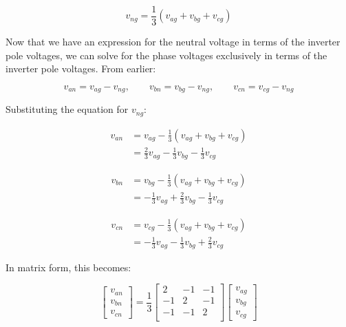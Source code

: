 \documentclass{article}
\begin{document}
\begin{equation}
    v_{ng} = \frac{1}{3}(v_{ag} + v_{bg} + v_{cg})
\end{equation}

Now that we have an expression for the neutral voltage in terms of the inverter pole voltages, we can solve for the phase voltages exclusively in terms of the inverter pole voltages. From earlier:

\begin{equation}
    v_{an} = v_{ag} - v_{ng}, \qquad
    v_{bn} = v_{bg} - v_{ng}, \qquad
    v_{cn} = v_{cg} - v_{ng}
\end{equation}

Substituting the equation for $v_{ng}$:

\begin{align}
    v_{an} &= v_{ag} - \frac{1}{3}(v_{ag} + v_{bg} + v_{cg}) \\
    &= \frac{2}{3}v_{ag} - \frac{1}{3}v_{bg} - \frac{1}{3}v_{cg}
\end{align}

\begin{align}
    v_{bn} &= v_{bg} - \frac{1}{3}(v_{ag} + v_{bg} + v_{cg}) \\
    &= - \frac{1}{3}v_{ag} + \frac{2}{3}v_{bg} - \frac{1}{3}v_{cg}
\end{align}

\begin{align}
    v_{cn} &= v_{cg} - \frac{1}{3}(v_{ag} + v_{bg} + v_{cg}) \\
    &= - \frac{1}{3}v_{ag} - \frac{1}{3}v_{bg} + \frac{2}{3}v_{cg}
\end{align}

In matrix form, this becomes:

\begin{equation}
    \begin{bmatrix}
        v_{an} \\
        v_{bn} \\
        v_{cn}
    \end{bmatrix}
    = \frac{1}{3}
    \begin{bmatrix}
        2 & -1 & -1 \\
        -1 & 2 & -1 \\
        -1 & -1 & 2 \\
    \end{bmatrix}
    \begin{bmatrix}
        v_{ag} \\
        v_{bg} \\
        v_{cg}
    \end{bmatrix}
\end{equation}
\end{document}
